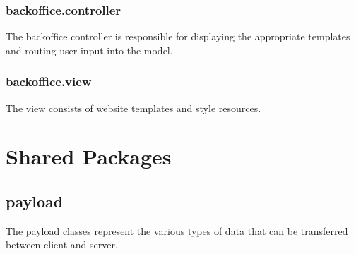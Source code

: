 \subsubsection{backoffice.controller}
The backoffice controller is responsible for displaying the appropriate templates and routing user input into the model.
\subsubsection{backoffice.view}
The view consists of website templates and style resources.
\section{Shared Packages}
\subsection{payload}
The payload classes represent the various types of data that can be transferred between client and server.